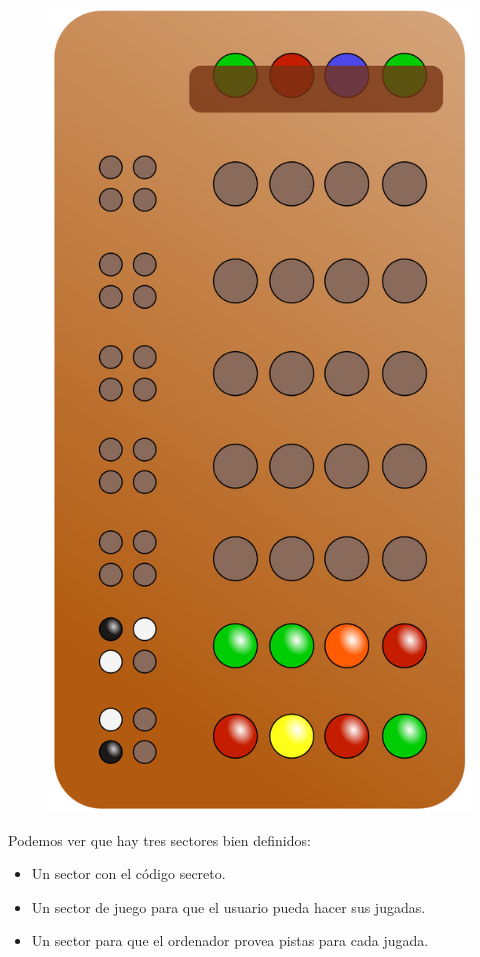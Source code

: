 \documentclass[a4paper,titlepage]{article}
\begin{document}
\begin{figure}[H]
    \centering
    \includegraphics[scale=0.2]{imgs/Mastermind.png}
\end{figure}

Podemos ver que hay tres sectores bien definidos:
\begin{itemize}
    \item Un sector con el código secreto.
    \item Un sector de juego para que el usuario pueda hacer sus jugadas.
    \item Un sector para que el ordenador provea pistas para cada jugada.
\end{itemize}
\end{document}
